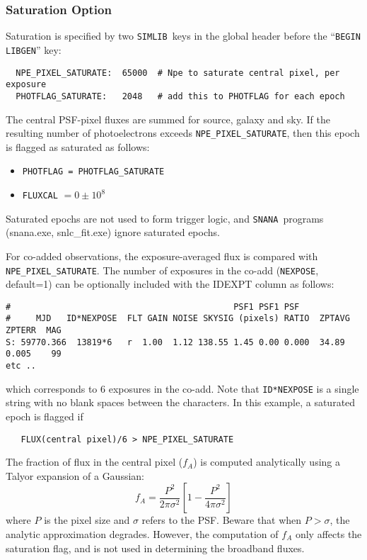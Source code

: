 \documentclass[12pt]{article}
\newcommand{\snana}{{\tt SNANA}}
\newcommand{\simlib}{{\tt SIMLIB}}
\begin{document}
{%
\clearpage
\subsubsection{Saturation Option}
\label{sssec:saturation}

Saturation is specified by two \simlib\ keys in the global header
before the ``{\tt BEGIN LIBGEN}'' key:
\begin{verbatim}
  NPE_PIXEL_SATURATE:  65000  # Npe to saturate central pixel, per exposure
  PHOTFLAG_SATURATE:   2048   # add this to PHOTFLAG for each epoch
\end{verbatim}
%
The central PSF-pixel fluxes are summed for source, galaxy and sky.
If the resulting number of photoelectrons exceeds 
{\tt NPE\_PIXEL\_SATURATE}, then this epoch is flagged 
as saturated as follows:
\begin{itemize}[noitemsep]
   \item {\tt PHOTFLAG = PHOTFLAG\_SATURATE}
   \item {\tt FLUXCAL} $= 0 \pm 10^8$
\end{itemize}
%
Saturated epochs are not used to form trigger logic,
and \snana\ programs (snana.exe, snlc\_fit.exe) ignore saturated epochs.

For co-added observations, the exposure-averaged flux is compared 
with {\tt NPE\_PIXEL\_SATURATE}. The number of exposures in the 
co-add ({\tt NEXPOSE}, default=1) can be optionally included 
with the IDEXPT column as follows:
\begin{verbatim}
#                                            PSF1 PSF1 PSF
#     MJD   ID*NEXPOSE  FLT GAIN NOISE SKYSIG (pixels) RATIO  ZPTAVG ZPTERR  MAG 
S: 59770.366  13819*6   r  1.00  1.12 138.55 1.45 0.00 0.000  34.89  0.005    99
etc ..
\end{verbatim}
%
which corresponds to 6 exposures in the co-add. 
Note that {\tt ID*NEXPOSE} is a single string with no blank spaces 
between the characters.
In this example, a saturated epoch is flagged if 
\begin{verbatim}
   FLUX(central pixel)/6 > NPE_PIXEL_SATURATE
\end{verbatim}

\medskip
\newcommand{\fA}{f_{A}}
\noindent The fraction of flux in the central pixel ($\fA$) 
is computed analytically using a Talyor expansion of a Gaussian:
$$ \fA = \frac{P^2}{2\pi\sigma^2} 
   \left[ 1 - \frac{P^2}{4\pi\sigma^2} \right] 
$$
%
where $P$ is the pixel size and $\sigma$ refers to the PSF.
Beware that when $P > \sigma$, the analytic approximation degrades.
However, the computation of $\fA$ only affects the saturation flag,
and is not used in determining the broadband fluxes.

}
\end{document}
